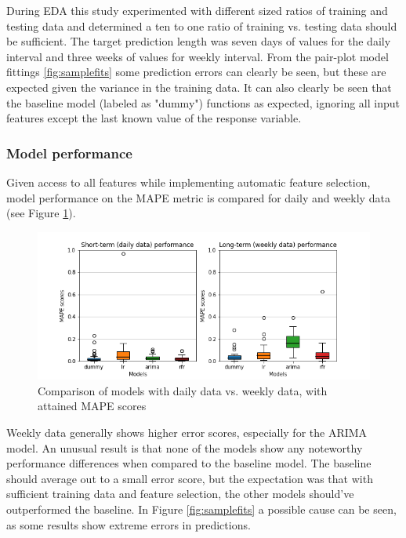 
During EDA this study experimented with different sized ratios of training and testing data and determined a ten to one ratio of training vs. testing data should be sufficient. The target prediction length was seven days of values for the daily interval and three weeks of values for weekly interval. From the pair-plot model fittings \ref{fig:samplefits} some prediction errors can clearly be seen, but these are expected given the variance in the training data. It can also clearly be seen that the baseline model (labeled as "dummy") functions as expected, ignoring all input features except the last known value of the response variable.

\subsubsection{Model performance}

Given access to all features while implementing automatic feature selection, model performance on the MAPE metric is compared for daily and weekly data (see Figure \ref{fig:modelcompare}).

\begin{figure}[H]
    \includegraphics[width=.4\paperwidth]{images/plots/base_model_comparison_daily_weekly.png}
    \caption{Comparison of models with daily data vs. weekly data, with attained MAPE scores}
    \label{fig:modelcompare}
\end{figure}

Weekly data generally shows higher error scores, especially for the ARIMA model. An unusual result is that none of the models show any noteworthy performance differences when compared to the baseline model. The baseline should average out to a small error score, but the expectation was that with sufficient training data and feature selection, the other models should've outperformed the baseline. In Figure \ref{fig:samplefits} a possible cause can be seen, as some results show extreme errors in predictions.

